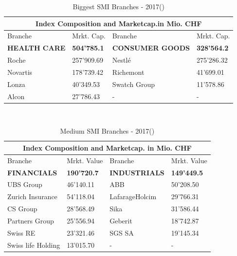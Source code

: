 \documentclass[11pt,a4paper]{article}
\begin{document}
\begin{table}[h]
\centering
\caption{Biggest SMI Branches - 2017(\cite{DieBoerse})}

\setlength{\arrayrulewidth}{0.5mm}
\setlength{\tabcolsep}{5pt}
\renewcommand{\arraystretch}{2}

{
\begin{tabular}[c]{ |p{3cm}|p{3cm}|p{3cm}|p{3cm}|  }
\hline
\multicolumn{4}{|c|}{Index Composition and Marketcap.in Mio. CHF} \\
\hline
Branche & Mrkt. Cap. & Branche & Mrkt. Cap. \\
\hline
\textbf{HEALTH CARE} & \textbf{504'785.1} & \textbf{CONSUMER GOODS} & \textbf{328'564.2} \\
Roche & 257’909.69 & Nestlé & 275’286.32 \\
Novartis & 178’739.42 & Richemont & 41’699.01 \\
Lonza & 40’349.53 & Swatch Group & 11’578.86 \\
Alcon & 27’786.43 & - & - \\
\hline
\end{tabular}
}
\end{table}
\\ 
\pagebreak

\begin{table}[h]
\centering\caption{Medium SMI Branches - 2017(\cite{DieBoerse})}

\setlength{\arrayrulewidth}{0.5mm}
\setlength{\tabcolsep}{5pt}
\renewcommand{\arraystretch}{2}

{
\begin{tabular}[c]{ |p{3cm}|p{3cm}| p{3cm}|p{3cm}| }
\hline
\multicolumn{4}{|c|}{Index Composition and Marketcap. in Mio. CHF} \\
\hline
Branche & Mrkt. Value & Branche & Mrkt. Value\\
\hline
\textbf{FINANCIALS} & \textbf{190'720.7}&\textbf{INDUSTRIALS} & \textbf{149'449.5} \\
UBS Group & 46’140.11 & ABB & 50’208.50 \\
Zurich Insurance & 54’118.04 & LafarageHolcim & 29’766.31 \\
CS Group & 28’568.49 & Sika & 31’586.44 \\
Partners Group & 25’556.94 & Geberit & 18’742.87 \\
Swiss RE & 23’321.46 & SGS SA & 19’145.34 \\
Swiss life Holding & 13’015.70 & - & - \\
\hline
\end{tabular}
}
\end{table}
\end{document}
